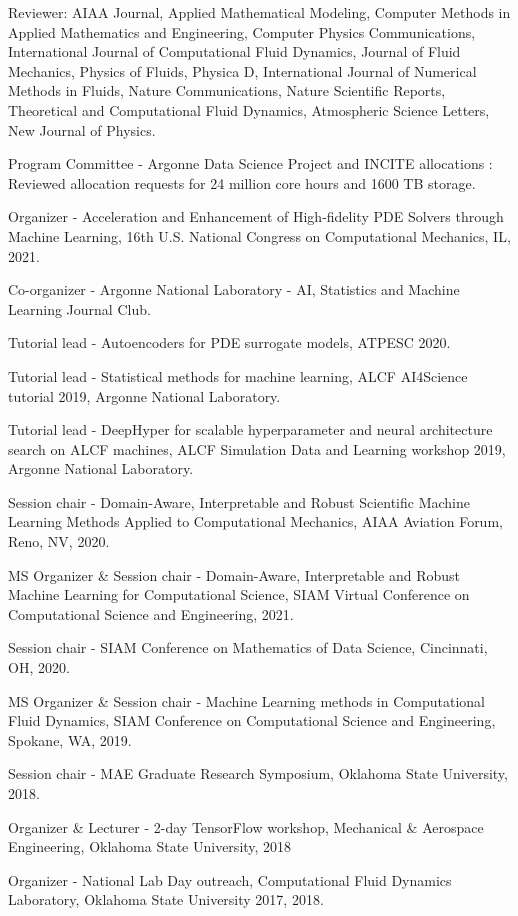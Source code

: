 \documentclass[letterpaper]{article}
\renewenvironment{itemize}{
  \begin{list}{}{
    \setlength{\leftmargin}{1.5em}
  }
}{
  \end{list}
}
\begin{document}
\begin{itemize}
    \item Reviewer: AIAA Journal, Applied Mathematical Modeling, Computer Methods in Applied Mathematics and Engineering, Computer Physics Communications, International Journal of Computational Fluid Dynamics, Journal of Fluid Mechanics, Physics of Fluids, Physica D, International Journal of Numerical Methods in Fluids, Nature Communications, Nature Scientific Reports, Theoretical and Computational Fluid Dynamics, Atmospheric Science Letters, New Journal of Physics.
    \item Program Committee - Argonne Data Science Project and INCITE allocations : Reviewed allocation requests for 24 million core hours and 1600 TB storage.
    \item Organizer - Acceleration and Enhancement of High-fidelity PDE Solvers through Machine Learning, 16th U.S. National Congress on Computational Mechanics, IL, 2021.
    \item Co-organizer - Argonne National Laboratory - AI, Statistics and Machine Learning Journal Club.
    \item Tutorial lead - Autoencoders for PDE surrogate models, ATPESC 2020.
    \item Tutorial lead - Statistical methods for machine learning, ALCF AI4Science tutorial 2019, Argonne National Laboratory.
    \item Tutorial lead - DeepHyper for scalable hyperparameter and neural architecture search on ALCF machines, ALCF Simulation Data and Learning workshop 2019, Argonne National Laboratory.
    \item Session chair - Domain-Aware, Interpretable and Robust Scientific Machine Learning Methods Applied to Computational Mechanics, AIAA Aviation Forum, Reno, NV, 2020.
    \item MS Organizer \& Session chair - Domain-Aware, Interpretable and Robust Machine Learning for Computational Science, SIAM Virtual Conference on Computational Science and Engineering, 2021.
    \item Session chair - SIAM Conference on Mathematics of Data Science, Cincinnati, OH, 2020.
    \item MS Organizer \& Session chair - Machine Learning methods in Computational Fluid Dynamics, SIAM Conference on Computational Science and Engineering, Spokane, WA, 2019.
    \item Session chair - MAE Graduate Research Symposium, Oklahoma State University, 2018.
    \item Organizer \& Lecturer - 2-day TensorFlow workshop, Mechanical \& Aerospace Engineering, Oklahoma State University, 2018
    \item Organizer - National Lab Day outreach, Computational Fluid Dynamics Laboratory, Oklahoma State University 2017, 2018.
\end{itemize}

\bigskip

\end{document}
